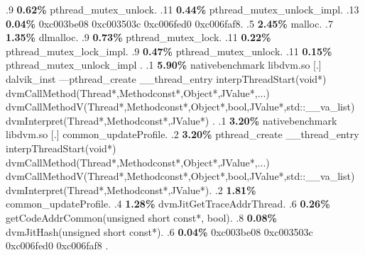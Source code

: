 \begin{profile}
{.9 \textbf{0.62\%} pthread\_mutex\_unlock. 
.11 \textbf{0.44\%} pthread\_mutex\_unlock\_impl. 
.13 \textbf{0.04\%} 0xc003be08\newline {} 0xc003503c\newline {} 0xc006fed0\newline {} 0xc006faf8. 
.5 \textbf{2.45\%} malloc. 
.7 \textbf{1.35\%} dlmalloc. 
.9 \textbf{0.73\%} pthread\_mutex\_lock. 
.11 \textbf{0.22\%} pthread\_mutex\_lock\_impl. 
.9 \textbf{0.47\%} pthread\_mutex\_unlock. 
.11 \textbf{0.15\%} pthread\_mutex\_unlock\_impl\newline {} . 
.1 \textbf{ 5.90\%} nativebenchmark  libdvm.so              [.] dalvik\_inst\newline {} ---pthread\_create\newline {} \_\_thread\_entry\newline {} interpThreadStart(void*)\newline {} dvmCallMethod(Thread*,Methodconst*,Object*,JValue*,...)\newline {} dvmCallMethodV(Thread*,Methodconst*,Object*,bool,JValue*,std::\_\_va\_list)\newline {} dvmInterpret(Thread*,Methodconst*,JValue*)\newline {} . 
.1 \textbf{ 3.20\%} nativebenchmark  libdvm.so              [.] common\_updateProfile. 
.2 \textbf{3.20\%} pthread\_create\newline {} \_\_thread\_entry\newline {} interpThreadStart(void*)\newline {} dvmCallMethod(Thread*,Methodconst*,Object*,JValue*,...)\newline {} dvmCallMethodV(Thread*,Methodconst*,Object*,bool,JValue*,std::\_\_va\_list)\newline {} dvmInterpret(Thread*,Methodconst*,JValue*). 
.2 \textbf{1.81\%} common\_updateProfile. 
.4 \textbf{1.28\%} dvmJitGetTraceAddrThread. 
.6 \textbf{0.26\%} getCodeAddrCommon(unsigned short const*, bool). 
.8 \textbf{0.08\%} dvmJitHash(unsigned short const*). 
.6 \textbf{0.04\%} 0xc003be08\newline {} 0xc003503c\newline {} 0xc006fed0\newline {} 0xc006faf8\newline {} . 
}
\end{profile}
